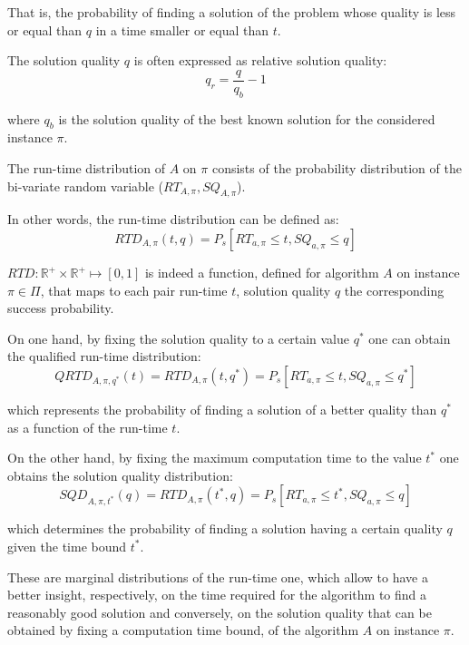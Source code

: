 That is, the probability of finding a solution of the problem whose quality is less or equal than $q$ in a time smaller or equal than $t$.

The solution quality $q$ is often expressed as relative solution quality:
\begin{equation}
  q_r = \frac{q}{q_b} - 1
\end{equation}

where $q_b$ is the solution quality of the best known solution for the considered instance $\pi$.

The run-time distribution of $A$ on $\pi$ consists of the probability distribution of the bi-variate random variable ($RT_{A,\pi},SQ_{A,\pi}$).

In other words, the run-time distribution can be defined as: 
\begin{equation}
  RTD_{A,\pi}(t,q) = P_s[RT_{a,\pi} \le t,SQ_{a,\pi} \le q]
\end{equation}

$RTD:\mathbb{R}^{+} \times \mathbb{R}^{+} \mapsto [0,1]$ is indeed a function, defined for algorithm $A$ on instance $\pi \in \Pi$, that maps to each pair run-time $t$, solution quality $q$ the corresponding success probability.


On one hand, by fixing the solution quality to a certain value $q^{*}$ one can obtain the qualified run-time distribution:
\begin{equation}
  QRTD_{A,\pi,q^{*}}(t) = RTD_{A,\pi}(t,q^{*}) = P_s[RT_{a,\pi} \le t,SQ_{a,\pi} \le q^{*}]
\end{equation}

which represents the probability of finding a solution of a better quality than $q^{*}$ as a function of the run-time $t$.


On the other hand, by fixing the maximum computation time to the value $t^{*}$ one obtains the solution quality distribution:
\begin{equation}
  SQD_{A,\pi,t^{*}}(q) = RTD_{A,\pi}(t^{*},q) = P_s[RT_{a,\pi} \le t^{*},SQ_{a,\pi} \le q]
\end{equation}

which determines the probability of finding a solution having a certain quality $q$ given the time bound $t^{*}$.

These are marginal distributions of the run-time one, which allow to have a better insight, respectively, on the time required for the algorithm to find a reasonably good solution and conversely, on the solution quality that can be obtained by fixing a computation time bound, of the algorithm $A$ on instance $\pi$.

